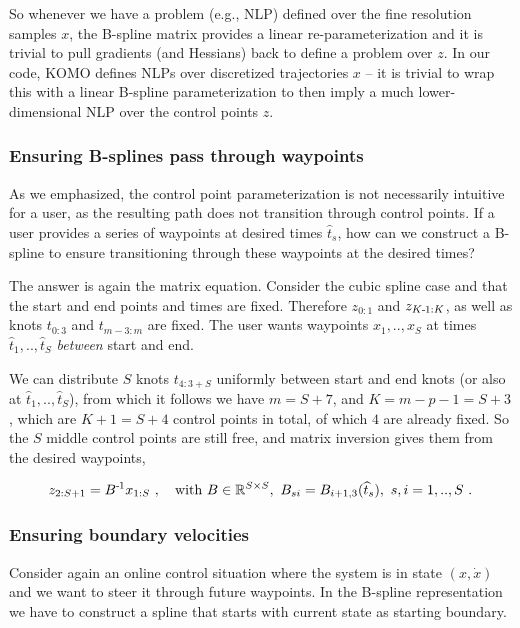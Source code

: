 So whenever we have a problem (e.g., NLP) defined over the fine
resolution samples $x$, the B-spline matrix provides a linear
re-parameterization and it is trivial to pull gradients (and Hessians)
back to define a problem over $z$. In our code, KOMO defines NLPs over
discretized trajectories $x$ -- it is trivial to wrap this with a linear B-spline parameterization to then imply a much lower-dimensional NLP over the control points $z$.

\subsubsection{Ensuring B-splines pass through waypoints}

As we emphasized, the control point parameterization is not necessarily intuitive for a user, as the resulting path does not transition through control points. If a user provides a series of waypoints at desired times $\hat t_s$, how can we construct a B-spline to ensure transitioning through these waypoints at the desired times?

The answer is again the matrix equation. Consider the cubic spline case and that the start and end points and times are fixed. Therefore $z_{0:1}$ and $z_{K{{\hspace*{-.0pt}\text{\rm -}\hspace*{-.5pt}}1}:K}$, as well as knots $t_{0:3}$ and $t_{m-3:m}$ are fixed. The user wants waypoints $x_1,..,x_S$ at times $\hat t_1,..,\hat t_S$ \emph{between} start and end.

We can distribute $S$ knots $t_{4:3+S}$ uniformly between start and end knots (or also at $\hat t_1,..,\hat t_S$), from which it follows we have $m = S+7$, and $K=m-p-1=S+3$, which are $K+1=S+4$ control points in total, of which $4$ are already fixed. So the $S$ middle control points are still free, and matrix inversion gives them from the desired waypoints,

\begin{align}
  z_{2:S+1} = B^{{\hspace*{-.0pt}\text{\rm -}\hspace*{-.5pt}}1} x_{1:S} ~,\quad \text{with } B \in {\mathbb{R}}^{S \times S},~ B_{si} =  B_{i+1,3}(\widehat t_s),~ s,i=1,..,S  ~.
\end{align}



\subsubsection{Ensuring boundary velocities}

Consider again an online control situation where the system is in state $(x,\dot x)$ and we want to steer it through future waypoints. In the B-spline representation we have to construct a spline that starts with current state as starting boundary.

